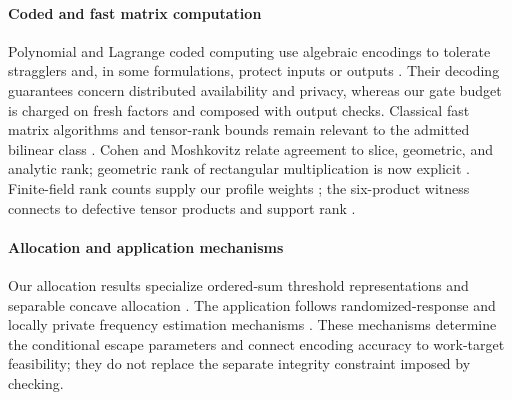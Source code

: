 \paragraph{Coded and fast matrix computation}
Polynomial and Lagrange coded computing use algebraic encodings to tolerate
stragglers and, in some formulations, protect inputs or outputs
\cite{yupolynomial2017,yulagrange2019}. Their decoding guarantees concern
distributed availability and privacy, whereas our gate budget is charged on
fresh factors and composed with output checks. Classical fast matrix
algorithms and tensor-rank bounds remain relevant to the admitted bilinear
class \cite{coppersmith1990matrix,algebraic,strassen}. Cohen and Moshkovitz
relate agreement to slice, geometric, and analytic rank; geometric rank of
rectangular multiplication is now explicit
\cite{cohen2022structure,kopparty2023geometric}. Finite-field rank counts
supply our profile weights \cite{LaksovThorup1994}; the six-product witness
connects to defective tensor products and support rank
\cite{KarppaKaski2019,BlaserChristandlZuiddam2017}.

\paragraph{Allocation and application mechanisms}
Our allocation results specialize ordered-sum threshold representations and
separable concave allocation \cite{OgryczakTamir2003,FedergruenGroenevelt1986}.
The application follows randomized-response and locally private frequency
estimation mechanisms \cite{warner1965randomized,erlingsson2014rappor,
dworkroth2014,wang2017local}. These mechanisms determine the conditional
escape parameters and connect encoding accuracy to work-target feasibility;
they do not replace the separate integrity constraint imposed by checking.
